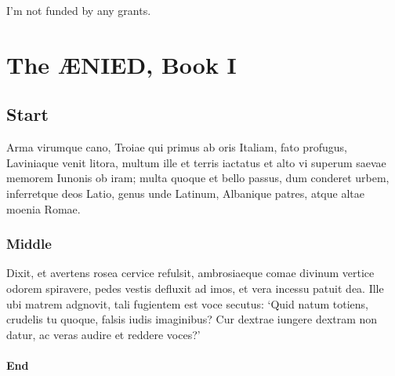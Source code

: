 \documentclass[ms,testing]{nuthesis}
\begin{document}
\begin{grantinfo}
  I'm not funded by any grants.
\end{grantinfo}

\tableofcontents
\listoffigures
\listoftables

\mainmatter

\chapter{The \AE{}NIED, Book I}\label{chap:aenied}

\section{Start}

Arma virumque cano, Troiae qui primus ab oris Italiam, fato profugus,
Laviniaque venit litora, multum ille et terris iactatus et alto vi
superum saevae memorem Iunonis ob iram; multa quoque et bello passus,
dum conderet urbem, inferretque deos Latio, genus unde Latinum,
Albanique patres, atque altae moenia Romae.\cite{virgil}

\subsection{Middle}

Dixit, et avertens rosea cervice refulsit, ambrosiaeque comae divinum
vertice odorem spiravere, pedes vestis defluxit ad imos, et vera
incessu patuit dea.  Ille ubi matrem adgnovit, tali fugientem est voce
secutus: `Quid natum totiens, crudelis tu quoque, falsis iudis
imaginibus?  Cur dextrae iungere dextram non datur, ac veras audire et
reddere voces?'\cite{virgil}

\subsubsection{End}
\end{document}
